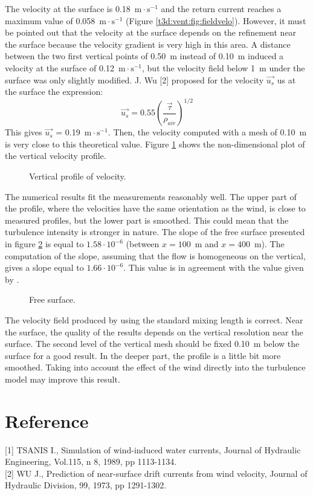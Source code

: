 \bigskip
The velocity at the surface is 0.18~$\text{m}\cdot \text{s}^{-1}$ and the return current reaches %
a maximum value of 0.058~$\text{m}\cdot \text{s}^{-1}$ (Figure \ref{t3d:vent:fig:fieldvelo}). %
However, it must be pointed out that the velocity at the surface depends
on the refinement near the surface because the velocity gradient is
very high in this area.
A distance between the two first vertical points of 0.50~m instead of
0.10~m induced a velocity at the surface of 0.12~$\text{m}\cdot \text{s}^{-1}$, but the velocity
field below 1~m under the surface was only slightly modified.
J. Wu [2] proposed for the velocity $\vec{u_s}$ us at the surface the expression:
\begin{equation*}
\vec{u_s} = 0.55 \left(\frac{\vec{\tau}}{\rho_{air}}\right)^{1/2}
\end{equation*}
This gives $\vec{u_s}$ = 0.19~$\text{m}\cdot \text{s}^{-1}$.
Then, the velocity computed with a mesh of 0.10~m is very close to
this theoretical value.
Figure \ref{t3d:vent:fig:profileV} shows the non-dimensional plot of the vertical velocity
profile.
\begin{figure}[!htbp]
 \centering
 \caption{Vertical profile of velocity.}
 \label{t3d:vent:fig:profileV}
\end{figure}
The numerical results fit the measurements reasonably well.
The upper part of the profile, where the velocities have the same
orientation as the wind, is close to measured profiles, but the lower
part is smoothed.
This could mean that the turbulence intensity is stronger in nature.
The slope of the free surface presented in figure \ref{t3d:vent:fig:FreeSurface}
is equal to $1.58\cdot 10^{-6}$ (between $x=100$~m and $x=400$~m). %
The computation of the slope, assuming that the flow is homogeneous on the vertical,
gives a slope equal to $1.66\cdot 10^{-6}$.
This value is in agreement with the value given by .

%
\begin{figure}[!htbp]
 \centering
 \caption{Free surface.}
 \label{t3d:vent:fig:FreeSurface}
\end{figure}

\bigskip
The velocity field produced by  using the standard mixing length is correct.
Near the surface, the quality of the results depends on the vertical resolution near the surface.
The second level of the vertical mesh should be fixed 0.10~m below the surface for a good result.
In the deeper part, the profile is a little bit more smoothed.
Taking into account the effect of the wind directly into the turbulence model
may improve this result.
%
\section{Reference}
%
[1] TSANIS I., Simulation of wind-induced water currents,
 Journal of Hydraulic Engineering, Vol.115, n 8, 1989, pp 1113-1134.\\

[2] WU J., Prediction of near-surface drift currents from wind velocity,
 Journal of Hydraulic Division, 99, 1973, pp 1291-1302.
